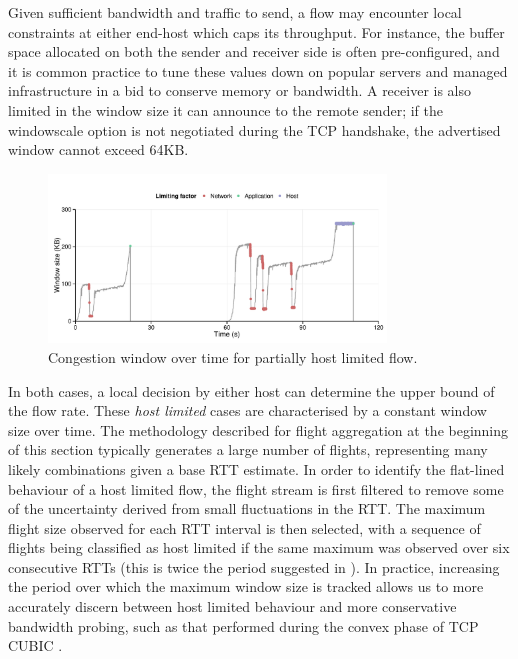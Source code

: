 Given sufficient bandwidth and traffic to send, a flow may encounter local constraints at either end-host which caps its throughput. 
For instance, the buffer space allocated on both the sender and receiver side is often pre-configured, and it is common practice to tune these values down on popular servers and managed infrastructure in a bid to conserve memory or bandwidth.
A receiver is also limited in the window size it can announce to the remote sender; if the windowscale option \cite{jacobson1992tcp} is not negotiated during the \ac{TCP} handshake, the advertised window cannot exceed 64KB.

\begin{figure}
\centering
  \includegraphics[width=0.8\textwidth]{figures/malawi/hostflow.pdf}
  \caption{Congestion window over time for partially host limited flow. \label{fig:hostlimited}}
\end{figure}

In both cases, a local decision by either host can determine the upper bound of the flow rate.
These \emph{host limited} cases are characterised by a constant window size over time.
The methodology described for flight aggregation at the beginning of this section typically generates a large number of flights, representing many likely combinations given a base \ac{RTT} estimate.
In order to identify the flat-lined behaviour of a host limited flow, the flight stream is first filtered to remove some of the uncertainty derived from small fluctuations in the \ac{RTT}.
The maximum flight size observed for each \ac{RTT} interval is then selected, with a sequence of flights being classified as host limited if the same maximum was observed over six consecutive \acp{RTT} (this is twice the period suggested in \cite{Zhang:2002p85}).
In practice, increasing the period over which the maximum window size is tracked allows us to more accurately discern between host limited behaviour and more conservative bandwidth probing, such as that performed during the convex phase of \ac{TCP} CUBIC \cite{Ha:2008p471}.

